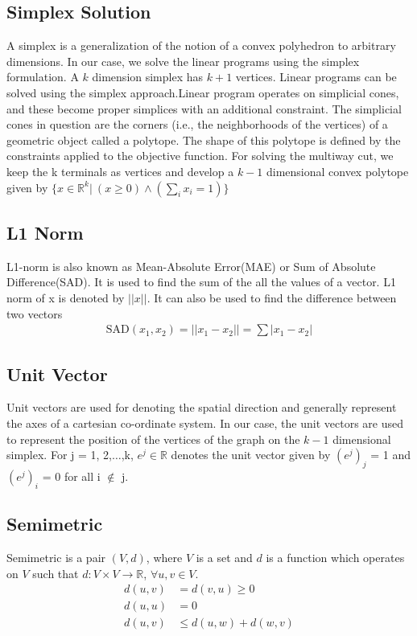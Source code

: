 \documentclass[11pt]{article}
\begin{document}
\subsection{Simplex Solution}
A simplex is a generalization of the notion of a convex polyhedron to arbitrary dimensions. In our case, we solve the linear programs using the simplex formulation. A $k$ dimension simplex has $k + 1$ vertices. Linear programs can be solved using the simplex approach.Linear program operates on simplicial cones, and these become proper simplices with an additional constraint. The simplicial cones in question are the corners (i.e., the neighborhoods of the vertices) of a geometric object called a polytope. The shape of this polytope is defined by the constraints applied to the objective function. For solving the multiway cut, we keep the k terminals as vertices and develop a $k-1$ dimensional convex polytope given by $\{x \in {\mathbb R}^k \vert \ (x \ge 0) \wedge (\sum\limits_i x_i = 1) \}$

\subsection{L1 Norm}
L1-norm is also known as Mean-Absolute Error(MAE) or Sum of Absolute Difference(SAD). It is used to find the sum of the all the values of a vector. L1 norm of x is denoted by $\vert\vert x \vert\vert$. It can also be used to find the difference between two vectors
\begin{align*}
\text{SAD}(x_1, x_2) = \vert \vert x_1 - x_2 \vert \vert = \sum \vert x_1 - x_2 \vert
\end{align*}

\subsection{Unit Vector}
Unit vectors are used for denoting the spatial direction and generally represent the axes of a cartesian co-ordinate system. In our case, the unit vectors are used to represent the position of the vertices of the graph on the $k-1$ dimensional simplex. For j = 1, 2,$\dots$,k, $e^j \in \mathbb{R}$ denotes the unit vector given by $(e^j)_j$ = 1 and $(e^j)_i$ = 0 for all i $\notin$ j.

\subsection{Semimetric}
Semimetric is a pair $(V, d)$, where $V$ is a set and $d$ is a function which operates on $V$ such that $d: V \times V \rightarrow \mathbb{R}$, $\forall u,v \in V$.
\begin{align*}
d(u, v) &= d(v, u) \ge 0\\
d(u, u) &= 0\\
d(u,v) &\le d(u,w) + d(w,v) 
\end{align*}
\end{document}
